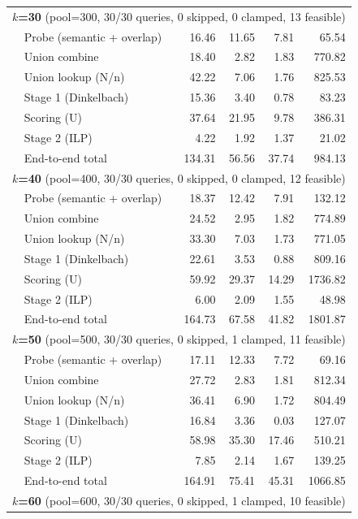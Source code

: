 \begin{longtable}{llrrrr}
\midrule
\multicolumn{6}{l}{\textbf{$k$=30} (pool=300, 30/30 queries, 0 skipped, 0 clamped, 13 feasible)\tnote{a}} \\
 & Probe (semantic + overlap) & 16.46 & 11.65 & 7.81 & 65.54 \\
 & Union combine & 18.40 & 2.82 & 1.83 & 770.82 \\
 & Union lookup (N/n) & 42.22 & 7.06 & 1.76 & 825.53 \\
 & Stage 1 (Dinkelbach)\tnote{b} & 15.36 & 3.40 & 0.78 & 83.23 \\
 & Scoring (U) & 37.64 & 21.95 & 9.78 & 386.31 \\
 & Stage 2 (ILP)\tnote{b} & 4.22 & 1.92 & 1.37 & 21.02 \\
 & End-to-end total & 134.31 & 56.56 & 37.74 & 984.13 \\
\midrule
\multicolumn{6}{l}{\textbf{$k$=40} (pool=400, 30/30 queries, 0 skipped, 0 clamped, 12 feasible)\tnote{a}} \\
 & Probe (semantic + overlap) & 18.37 & 12.42 & 7.91 & 132.12 \\
 & Union combine & 24.52 & 2.95 & 1.82 & 774.89 \\
 & Union lookup (N/n) & 33.30 & 7.03 & 1.73 & 771.05 \\
 & Stage 1 (Dinkelbach)\tnote{b} & 22.61 & 3.53 & 0.88 & 809.16 \\
 & Scoring (U) & 59.92 & 29.37 & 14.29 & 1736.82 \\
 & Stage 2 (ILP)\tnote{b} & 6.00 & 2.09 & 1.55 & 48.98 \\
 & End-to-end total & 164.73 & 67.58 & 41.82 & 1801.87 \\
\midrule
\multicolumn{6}{l}{\textbf{$k$=50} (pool=500, 30/30 queries, 0 skipped, 1 clamped, 11 feasible)\tnote{a}} \\
 & Probe (semantic + overlap) & 17.11 & 12.33 & 7.72 & 69.16 \\
 & Union combine & 27.72 & 2.83 & 1.81 & 812.34 \\
 & Union lookup (N/n) & 36.41 & 6.90 & 1.72 & 804.49 \\
 & Stage 1 (Dinkelbach)\tnote{b} & 16.84 & 3.36 & 0.03 & 127.07 \\
 & Scoring (U) & 58.98 & 35.30 & 17.46 & 510.21 \\
 & Stage 2 (ILP)\tnote{b} & 7.85 & 2.14 & 1.67 & 139.25 \\
 & End-to-end total & 164.91 & 75.41 & 45.31 & 1066.85 \\
\midrule
\multicolumn{6}{l}{\textbf{$k$=60} (pool=600, 30/30 queries, 0 skipped, 1 clamped, 10 feasible)\tnote{a}} \\

\end{longtable}
